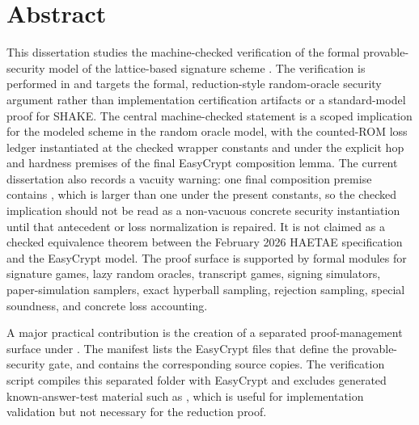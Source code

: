 \chapter*{Abstract}

This dissertation studies the machine-checked verification of the formal
provable-security model of the lattice-based signature scheme \haetae{}.  The
verification is performed in \easycrypt{} and targets the formal,
reduction-style random-oracle security argument rather than implementation
certification artifacts or a standard-model proof for SHAKE.  The central
machine-checked statement is a scoped \eufcma{} implication for the modeled
scheme in the random oracle model, with the counted-ROM loss ledger
instantiated at the checked wrapper constants and under the explicit hop and
hardness premises of the final EasyCrypt composition lemma.  The current
dissertation also records a vacuity warning: one final
composition premise contains , which is
larger than one under the present constants, so the checked implication should
not be read as a non-vacuous concrete security instantiation until that
antecedent or loss normalization is repaired.  It is not claimed as a checked
equivalence theorem between the February 2026 HAETAE specification and the
EasyCrypt model.  The proof surface is supported by formal
modules for signature games, lazy random oracles, transcript games, signing
simulators, paper-simulation samplers, exact hyperball sampling, rejection
sampling, special soundness, and concrete loss accounting.

A major practical contribution is the creation of a separated proof-management
surface under .  The manifest
 lists the EasyCrypt files that define
the provable-security gate, and  contains the
corresponding source copies.  The verification script compiles this separated
folder with EasyCrypt and excludes generated known-answer-test material such as
, which is useful for
implementation validation but not necessary for the reduction proof.

